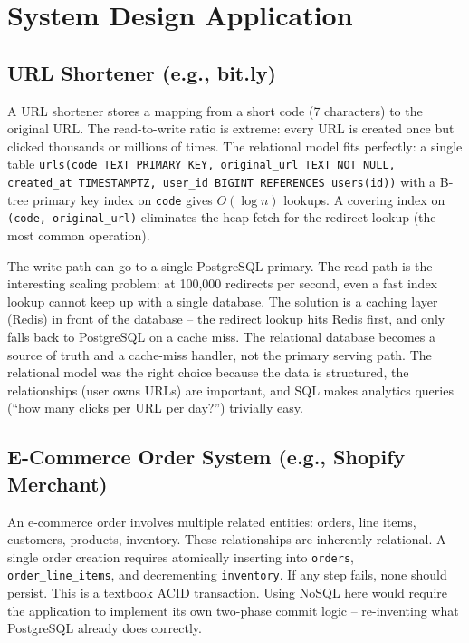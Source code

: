 \documentclass[11pt,a4paper]{article}
\begin{document}
\newpage

\section{System Design Application}

\subsection{URL Shortener (e.g., bit.ly)}

A URL shortener stores a mapping from a short code (7 characters) to the original URL. The read-to-write ratio is extreme: every URL is created once but clicked thousands or millions of times. The relational model fits perfectly: a single table \texttt{urls(code TEXT PRIMARY KEY, original\_url TEXT NOT NULL, created\_at TIMESTAMPTZ, user\_id BIGINT REFERENCES users(id))} with a B-tree primary key index on \texttt{code} gives $O(\log n)$ lookups. A covering index on \texttt{(code, original\_url)} eliminates the heap fetch for the redirect lookup (the most common operation).

The write path can go to a single PostgreSQL primary. The read path is the interesting scaling problem: at 100,000 redirects per second, even a fast index lookup cannot keep up with a single database. The solution is a caching layer (Redis) in front of the database -- the redirect lookup hits Redis first, and only falls back to PostgreSQL on a cache miss. The relational database becomes a source of truth and a cache-miss handler, not the primary serving path. The relational model was the right choice because the data is structured, the relationships (user owns URLs) are important, and SQL makes analytics queries (``how many clicks per URL per day?'') trivially easy.

\subsection{E-Commerce Order System (e.g., Shopify Merchant)}

An e-commerce order involves multiple related entities: orders, line items, customers, products, inventory. These relationships are inherently relational. A single order creation requires atomically inserting into \texttt{orders}, \texttt{order\_line\_items}, and decrementing \texttt{inventory}. If any step fails, none should persist. This is a textbook ACID transaction. Using NoSQL here would require the application to implement its own two-phase commit logic -- re-inventing what PostgreSQL already does correctly.
\end{document}
